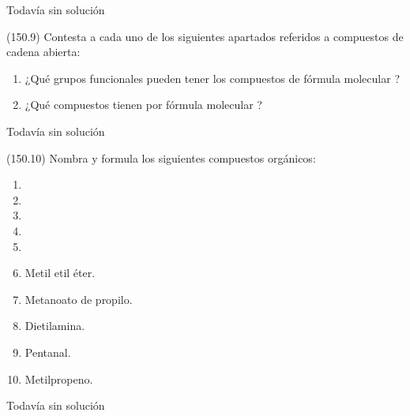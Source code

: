  \begin{solution}[print=false]
    Todavía sin solución
  \end{solution}




  \begin{exercise}[
      tags    = {},
      topics  = {química, química orgánica, orgánica},
      source  = {FQ 1B MGH 2016, p150, e9},
    ]
    (150.9) Contesta a cada uno de los siguientes apartados referidos a
    compuestos de cadena abierta:
    \begin{enumerate}
      \item ¿Qué grupos funcionales pueden tener los compuestos de
      fórmula molecular ?
      \item ¿Qué compuestos tienen por fórmula molecular ?
    \end{enumerate}
  \end{exercise}

  \begin{solution}[print=false]
    Todavía sin solución
  \end{solution}




  \begin{exercise}[
      tags    = {},
      topics  = {química, química orgánica, orgánica},
      source  = {FQ 1B MGH 2016, p150, e10},
    ]
    (150.10) Nombra y formula los siguientes compuestos orgánicos:
    \begin{enumerate}
      \item {}
      \item {}
      \item {}
      \item {}
      \item {}
      \item Metil etil éter.
      \item Metanoato de propilo.
      \item Dietilamina.
      \item Pentanal.
      \item Metilpropeno.
    \end{enumerate}
  \end{exercise}

  \begin{solution}[print=false]
    Todavía sin solución
  \end{solution}




